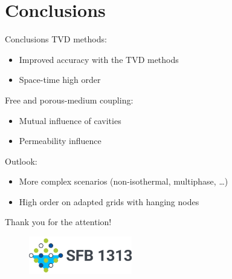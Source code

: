 \documentclass{beamer}
\begin{document}
\section{Conclusions} %
\begin{frame}{Conclusions}
TVD methods:
\begin{itemize}
	\item Improved accuracy with the TVD methods
	\item Space-time high order
\end{itemize}
Free and porous-medium coupling:
\begin{itemize}
	\item Mutual influence of cavities
	\item Permeability influence
\end{itemize}
Outlook:
\begin{itemize}
	\item More complex scenarios (non-isothermal, multiphase, \dots)
	\item High order on adapted grids with hanging nodes
\end{itemize}
\end{frame}
\begin{frame}
	\centering
	{\LARGE Thank you for the attention!}
	\vspace{2cm}
	\begin{figure}
		\centering
		\includegraphics[width=0.4\textwidth]{logosfb.png}
	\end{figure}
	
\end{frame}
\appendix
\end{document}
